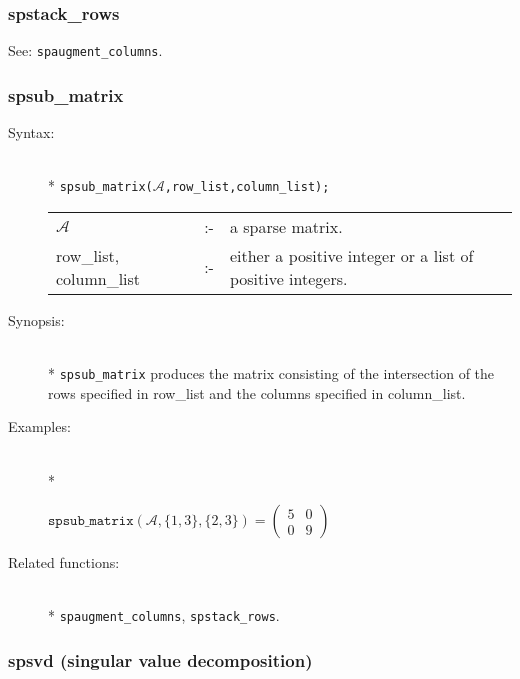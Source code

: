 \subsubsection{spstack\_rows}
\label{sparse:spstack_rows}

See: \texttt{spaugment\_columns}.


\subsubsection{spsub\_matrix}
\label{sparse:spsub_matrix}

\begin{description}
\item[Syntax:]\mbox{}\\*
\texttt{spsub\_matrix($\mathcal{A}$,row\_list,column\_list);}\\[2mm]
\begin{tabular}{l l l} 
$\mathcal{A}$              &:-& a sparse matrix. \\
row\_list, column\_list &:-& \parbox[t]{.605\linewidth}{either a 
positive integer or a list of positive integers.}
\end{tabular}

\item[Synopsis:]\mbox{}\\*
\texttt{spsub\_matrix} produces the matrix consisting of the
              intersection of the rows specified in row\_list and the 
columns specified in column\_list. 

\item[Examples:]\mbox{}\\*
\begin{flushleft}  
\hspace*{0.1in}
\begin{math}  
\texttt{spsub\_matrix}(\mathcal{A},\{1,3\},\{2,3\}) =
        \begin{pmatrix} 5 & 0\\ 0 & 9 \end{pmatrix}
\end{math}  
\end{flushleft}

\item[Related functions:]\mbox{}\\*
\texttt{spaugment\_columns}, \texttt{spstack\_rows}.
\end{description}

\subsubsection{spsvd (singular value decomposition)}
\label{sparse:spsvd} 

